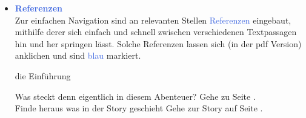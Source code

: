 \begin{itemize}
  \begin{centering}
    \noindent{}
  \end{centering}

  \item \textcolor{RoyalBlue}{\textbf{Referenzen}} \\
  Zur einfachen Navigation sind an relevanten Stellen \textcolor{RoyalBlue}{Referenzen} eingebaut, mithilfe derer sich einfach und
  schnell zwischen verschiedenen Textpassagen hin und her springen lässt. Solche Referenzen lassen sich (in der pdf
  Version) anklichen und sind \textcolor{RoyalBlue}{blau} markiert.

  \vspace{-5pt}
  \begin{refbox}{die Einführung}

      Was steckt denn eigentlich in diesem Abenteuer? \then Gehe zu Seite . \\
      Finde heraus was in der Story geschieht \then Gehe zur Story auf Seite .
  \end{refbox}
  \vspace{-5pt}

\end{itemize}
